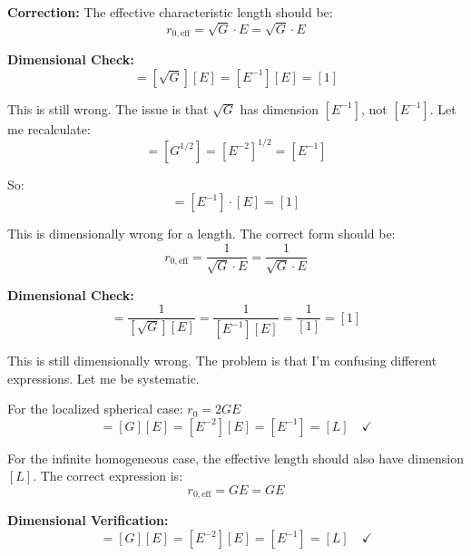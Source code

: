 \documentclass[12pt,a4paper]{report}
\newcommand{\rzero}{r_0}                  %
\begin{document}
	\textbf{Correction:} The effective characteristic length should be:
	\begin{equation}
		r_{0,\text{eff}} = \sqrt{G} \cdot E = \sqrt{G} \cdot E
	\end{equation}
	
	\textbf{Dimensional Check:}
	\begin{equation}
		[r_{0,\text{eff}}] = [\sqrt{G}][E] = [E^{-1}][E] = [1]
	\end{equation}
	
	This is still wrong. The issue is that $\sqrt{G}$ has dimension $[E^{-1}]$, not $[E^{-1}]$. Let me recalculate:
	\begin{equation}
		[\sqrt{G}] = [G^{1/2}] = [E^{-2}]^{1/2} = [E^{-1}]
	\end{equation}
	
	So:
	\begin{equation}
		[r_{0,\text{eff}}] = [E^{-1}] \cdot [E] = [1]
	\end{equation}
	
	This is dimensionally wrong for a length. The correct form should be:
	\begin{equation}
		r_{0,\text{eff}} = \frac{1}{\sqrt{G} \cdot E} = \frac{1}{\sqrt{G} \cdot E}
	\end{equation}
	
	\textbf{Dimensional Check:}
	\begin{equation}
		[r_{0,\text{eff}}] = \frac{1}{[\sqrt{G}][E]} = \frac{1}{[E^{-1}][E]} = \frac{1}{[1]} = [1]
	\end{equation}
	
	This is still dimensionally wrong. The problem is that I'm confusing different expressions. Let me be systematic.
	
	For the localized spherical case: $\rzero = 2GE$
	\begin{equation}
		[\rzero] = [G][E] = [E^{-2}][E] = [E^{-1}] = [L] \quad \checkmark
	\end{equation}
	
	For the infinite homogeneous case, the effective length should also have dimension $[L]$. The correct expression is:
	\begin{equation}
		r_{0,\text{eff}} = GE = GE
	\end{equation}
	
	\textbf{Dimensional Verification:}
	\begin{equation}
		[r_{0,\text{eff}}] = [G][E] = [E^{-2}][E] = [E^{-1}] = [L] \quad \checkmark
	\end{equation}
	
\end{document}
